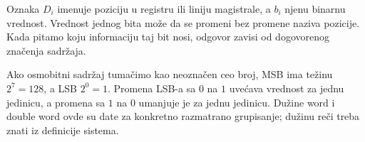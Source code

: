 
Oznaka $D_i$ imenuje poziciju u registru ili liniju magistrale, a $b_i$ njenu binarnu vrednost. Vrednost jednog bita može da se promeni bez promene naziva pozicije. Kada pitamo koju informaciju taj bit nosi, odgovor zavisi od dogovorenog značenja sadržaja.

Ako osmobitni sadržaj tumačimo kao neoznačen ceo broj, MSB ima težinu $2^7=128$, a LSB $2^0=1$. Promena LSB-a sa $0$ na $1$ uvećava vrednost za jednu jedinicu, a promena sa $1$ na $0$ umanjuje je za jednu jedinicu. Dužine word i double word ovde su date za konkretno razmatrano grupisanje; dužinu reči treba znati iz definicije sistema.
